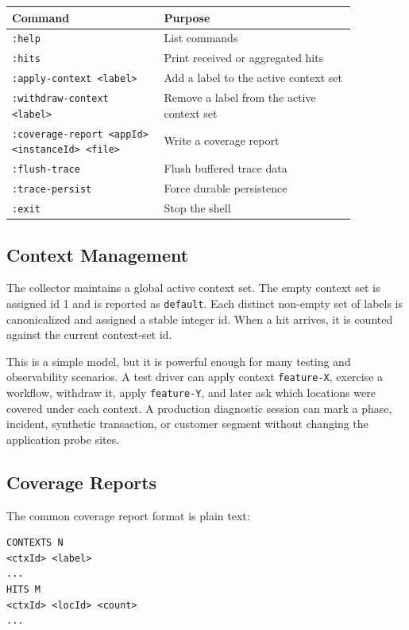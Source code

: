 \documentclass[11pt]{article}
\newcommand{\code}[1]{\texttt{#1}}
\begin{document}
\begin{center}
\small
\begin{tabular}{>{\raggedright\arraybackslash}p{0.38\linewidth}%
                >{\raggedright\arraybackslash}p{0.48\linewidth}}
\textbf{Command} & \textbf{Purpose} \\
\hline
\code{:help} & List commands \\
\code{:hits} & Print received or aggregated hits \\
\code{:apply-context <label>} & Add a label to the active context set \\
\code{:withdraw-context <label>} & Remove a label from the active context set \\
\code{:coverage-report <appId> <instanceId> <file>} & Write a coverage report \\
\code{:flush-trace} & Flush buffered trace data \\
\code{:trace-persist} & Force durable persistence \\
\code{:exit} & Stop the shell \\
\end{tabular}
\end{center}

\subsection{Context Management}

The collector maintains a global active context set. The empty context set is
assigned id 1 and is reported as \code{default}. Each distinct non-empty set of
labels is canonicalized and assigned a stable integer id. When a hit arrives,
it is counted against the current context-set id.

This is a simple model, but it is powerful enough for many testing and
observability scenarios. A test driver can apply context \code{feature-X},
exercise a workflow, withdraw it, apply \code{feature-Y}, and later ask which
locations were covered under each context. A production diagnostic session can
mark a phase, incident, synthetic transaction, or customer segment without
changing the application probe sites.

\subsection{Coverage Reports}

The common coverage report format is plain text:

\begin{verbatim}
CONTEXTS N
<ctxId> <label>
...
HITS M
<ctxId> <locId> <count>
...
\end{verbatim}
\end{document}
